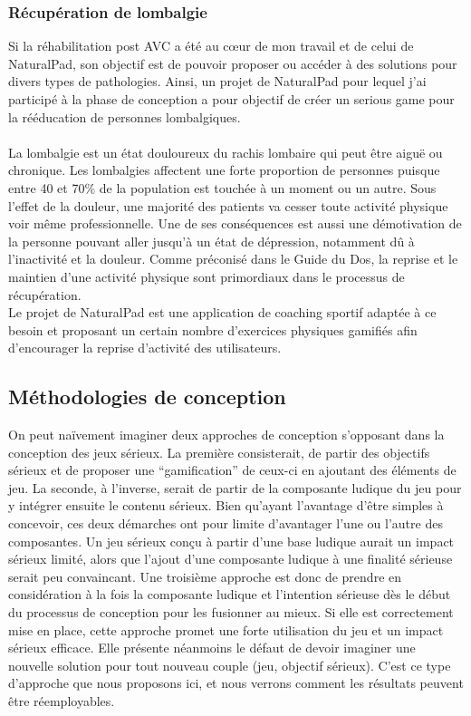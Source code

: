 	\subsubsection*{Récupération de lombalgie}
Si la réhabilitation post AVC a été au cœur de mon travail et de celui de NaturalPad, son objectif est de pouvoir proposer ou accéder à des solutions pour divers types de pathologies. Ainsi, un projet de NaturalPad pour lequel j'ai participé à la phase de conception a pour objectif de créer un serious game pour la rééducation de personnes lombalgiques.
\paragraph{}
La lombalgie est un état douloureux du rachis lombaire qui peut être aiguë ou chronique. Les lombalgies affectent une forte proportion de personnes puisque entre 40 et 70\% de la population est touchée à un moment ou un autre. Sous l'effet de la douleur, une majorité des patients va cesser toute activité physique voir même professionnelle. Une de ses conséquences est aussi une démotivation de la personne pouvant aller jusqu'à un état de dépression, notamment dû à l'inactivité et la douleur. Comme préconisé dans le Guide du Dos\cite{backbook}, la reprise et le maintien d'une activité physique sont primordiaux dans le processus de récupération. \\
Le projet de NaturalPad est une application de coaching sportif adaptée à ce besoin et proposant un certain nombre d'exercices physiques gamifiés afin d'encourager la reprise d'activité des utilisateurs.

	
	
	\subsection{Méthodologies de conception}
On peut naïvement imaginer deux approches de conception s’opposant dans la conception des jeux sérieux. La première consisterait, de partir des objectifs sérieux et de proposer une “gamification” de ceux-ci en ajoutant des éléments de jeu. La seconde, à l’inverse, serait de partir de la composante ludique du jeu pour y intégrer ensuite le contenu sérieux. Bien qu’ayant l’avantage d’être simples à concevoir, ces deux démarches ont pour limite d’avantager l’une ou l’autre des composantes. Un jeu sérieux conçu à partir d’une base ludique aurait un impact sérieux limité, alors que l’ajout d’une composante ludique à une finalité sérieuse serait peu convaincant.
Une troisième approche est donc de prendre en considération à la fois la composante ludique et l’intention sérieuse dès le début du processus de conception pour les fusionner au mieux. Si elle est correctement mise en place, cette approche promet une forte utilisation du jeu et un impact sérieux efficace. Elle présente néanmoins le défaut de devoir imaginer une nouvelle solution pour tout nouveau couple (jeu, objectif sérieux). C’est ce type d’approche que nous proposons ici, et nous verrons comment les résultats peuvent être réemployables.

